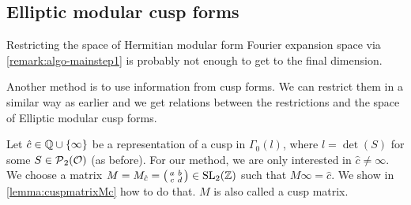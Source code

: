 \subsection{Elliptic modular cusp forms}
\label{cuspInfo}

Restricting the space of Hermitian modular form Fourier expansion space via \cref{remark:algo-mainstep1} is probably not enough to get to the final dimension.

Another method is to use information from cusp forms. We can restrict them in a similar way as earlier and we get relations between the restrictions and the space of Elliptic modular cusp forms.

\begin{prelim}
\label{prelim:cuspInfo}
Let $\hat{c} \in \Q \cup \Set{\infty}$ be a representation of a cusp in $\Gamma_0(l)$, where $l = \det(S)$ for some $S \in \operatorname{\mathcal{P}}_2(\mathcal{O})$ (as before). For our method, we are only interested in $\hat{c} \ne \infty$. We choose a matrix $M = M_{\hat{c}} = \left( \begin{smallmatrix} a & b \\ c & d \end{smallmatrix} \right) \in \operatorname{SL}_2(\mathbb{Z})$ such that $M \infty = \hat{c}$. We show in \cref{lemma:cuspmatrixMc} how to do that. $M$ is also called a cusp matrix.


\end{prelim}

